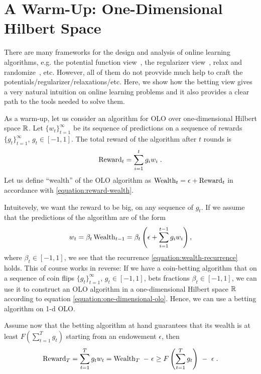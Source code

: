 \section{A Warm-Up: One-Dimensional Hilbert Space}
\label{section:one-dimensional-hilbert-space-olo}

There are many frameworks for the design and analysis of online learning algorithms, e.g. the potential function view~\cite{Cesa-BianchiL06}, the regularizer view~\cite{}, relax and randomize~\cite{}, etc. However, all of them do not provvide much help to craft the potentials/regularizer/relaxations/etc.
Here, we show how the betting view gives a very natural intuition on online learning problems and it also provides a clear path to the tools needed to solve them.

As a warm-up, let us consider an algorithm for OLO over one-dimensional Hilbert space $\mathbb{R}$.
Let $\{w_t\}_{t=1}^\infty$ be its sequence of predictions on a sequence of
rewards $\{g_t\}_{t=1}^\infty$, $g_t \in [-1,1]$. The total reward of the
algorithm after $t$ rounds is
\[
\operatorname{Reward}_t = \sum_{i=1}^t g_i w_i \; .
\]
Let us define ``wealth'' of the OLO algorithm as $\operatorname{Wealth}_t = \epsilon +
\operatorname{Reward}_t$ in accordance with \eqref{equation:reward-wealth}.

Intuitevely, we want the reward to be big, on any sequence of $g_t$. If we assume that the predictions of the algorithm
are of the form
\begin{equation}
\label{equation:one-dimensional-olo}
w_t = \beta_t \operatorname{Wealth}_{t-1}
= \beta_t \left(\epsilon+ \sum_{i=1}^{t-1} g_i w_i \right),
\end{equation}
where $\beta_t \in [-1,1]$, we see that the recurrence
\eqref{equation:wealth-recurrence} holds.
This of course works in reverse: If we have a coin-betting algorithm that on a
sequence of coin flips $\{g_t\}_{t=1}^\infty$, $g_t \in [-1,1]$, bets fractions
$\beta_t \in [-1,1]$, we can use it to construct an OLO algorithm in a
one-dimensional Hilbert space $\mathbb{R}$ according to equation
\eqref{equation:one-dimensional-olo}. Hence, we can use a betting algorithm on 1-d \ac{OLO}.

Assume now that the betting algorithm at hand guarantees that its wealth is at least $F(\sum_{t=1}^T g_t)$ starting from an endowement $\epsilon$, then 
\begin{equation}
\label{equation:one-dimensional-olo-reward-lower-bound}
\Reward_T
= \sum_{t=1}^T g_t w_t
= \Wealth_T \ - \ \epsilon \ge F\left(\sum_{t=1}^T g_t \right) \ - \ \epsilon \; .
\end{equation}

